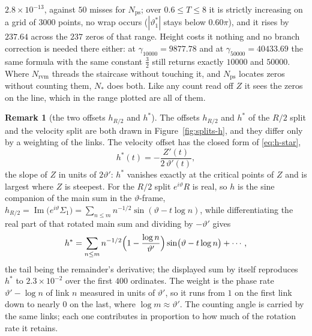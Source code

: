 \documentclass[11pt]{article}
\theoremstyle{definition}
\newtheorem{remark}[theorem]{Remark}
\begin{document}
$2.8\times10^{-13}$, against $50$ misses for $N_{\mathrm{ps}}$; over
$0.6\leq T\leq8$ it is strictly increasing on a grid of $3000$ points, no wrap
occurs ($|\vartheta_1^{\ast}|$ stays below $0.60\pi$), and it rises by $237.64$
across the $237$ zeros of that range. Height costs it nothing and no branch
correction is needed there either: at $\gamma_{10000}=9877.78$ and at
$\gamma_{50000}=40433.69$ the same formula with the same constant $\tfrac32$
still returns exactly $10000$ and $50000$. Where $N_{\mathrm{rvm}}$ threads the
staircase without touching it, and $N_{\mathrm{ps}}$ locates zeros without
counting them, $N_{\ast}$ does both. Like any count read off $Z$ it sees the
zeros on the line, which in the range plotted are all of them.

\begin{remark}[the two offsets $h_{R/2}$ and $h^{\ast}$]\label{rem:taper}
The offsets $h_{R/2}$ and $h^{\ast}$ of the $R/2$ split and the velocity split
are both drawn in Figure~\ref{fig:splits-h}, and they differ only by a
weighting of the links. The velocity offset has the closed form of
\eqref{eq:h-star},
\begin{equation}\label{eq:h-star-slope}
h^{\ast}(t)=-\frac{Z'(t)}{2\,\vartheta'(t)},
\end{equation}
the slope of $Z$ in units of $2\vartheta'$: $h^{\ast}$ vanishes exactly at the
critical points of $Z$ and is largest where $Z$ is steepest. For the $R/2$ split
$e^{i\vartheta}R$ is real, so $h$ is the sine companion of the main sum in the
$\vartheta$-frame,
$h_{R/2}=\operatorname{Im}\bigl(e^{i\vartheta}\Sigma_1\bigr)
=\sum_{n\leq m}n^{-1/2}\sin(\vartheta-t\log n)$, while differentiating the real
part of that rotated main sum and dividing by $-\vartheta'$ gives
\[
h^{\ast}=\sum_{n\leq m}n^{-1/2}
\Bigl(1-\frac{\log n}{\vartheta'}\Bigr)\sin\bigl(\vartheta-t\log n\bigr)+\cdots,
\]
the tail being the remainder's derivative; the displayed sum by itself
reproduces $h^{\ast}$ to $2.3\times10^{-2}$ over the first $400$ ordinates.
The weight is the phase rate $\vartheta'-\log n$ of link $n$ measured in units of
$\vartheta'$, so it runs from $1$ on the first link down to nearly $0$ on the last,
where $\log m\approx\vartheta'$. The counting angle is carried by the same links;
each one contributes in proportion to how much of the rotation rate it retains.
\end{remark}
\end{document}
